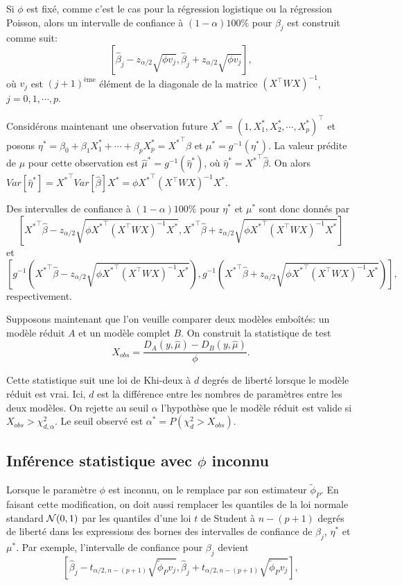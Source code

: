 \documentclass[11pt]{article}
\begin{document}
\noindent Si $\phi$ est fix\'e, comme c'est le cas pour la r\'egression logistique ou la r\'egression Poisson, alors un intervalle de confiance \`a $(1-\alpha)100\%$ pour $\beta_j$ est construit comme suit:
$$\left[\hat\beta_j -z_{\alpha/2} \sqrt{ \phi v_j},\hat\beta_j +z_{\alpha/2} \sqrt{ \phi v_j} \right],$$
o\`u $v_j$ est $(j+1)^{\mbox{\`eme}}$ \'el\'ement de la diagonale de la matrice $(X^\top W X)^{-1}$, $j=0,1,\cdots,p$.

\noindent Consid\'erons maintenant une observation future $X^*=(1,X_1^*,X_2^*,\cdots,X_p^*)^\top$ et posons $\eta^*=\beta_0+\beta_1 X_1^* + \cdots + \beta_p X_p^*= {X^*}^\top\beta$ et $\mu^*=g^{-1}(\eta^*)$. La valeur pr\'edite de $\mu$ pour cette observation est $\hat\mu^*=g^{-1}(\hat\eta^*)$, o\`u $\hat\eta^*={X^*}^\top\hat\beta$. On  alors $Var[\hat\eta^*]={X^*}^\top Var[\hat\beta]X^* =\phi {X^*}^\top (X^\top W X)^{-1} X^*$. 

\noindent Des intervalles de confiance \`a $(1-\alpha)100\%$ pour $\eta^*$ et $\mu^*$ sont donc donn\'es par
$$\left[{X^*}^\top\hat\beta -  z_{\alpha/2} \sqrt{\phi {X^*}^\top (X^\top W X)^{-1} X^*}, {X^*}^\top\hat\beta +  z_{\alpha/2} \sqrt{\phi {X^*}^\top (X^\top W X)^{-1} X^*}\right]$$
et
$$\left[g^{-1}\left({X^*}^\top\hat\beta -  z_{\alpha/2} \sqrt{\phi {X^*}^\top (X^\top W X)^{-1} X^*}\right), g^{-1}\left({X^*}^\top\hat\beta +  z_{\alpha/2} \sqrt{\phi {X^*}^\top (X^\top W X)^{-1} X^*}\right)\right],$$
\noindent respectivement.

\noindent Supposons maintenant que l'on veuille comparer deux mod\`eles embo\^it\'es: un mod\`ele r\'eduit $A$ et un mod\`ele complet $B$. On construit la statistique de test
$$X_{obs} = \frac{D_A(y,\hat\mu)-D_B(y,\hat\mu)}{\phi}.$$

\noindent Cette statistique suit une loi de Khi-deux \`a $d$ degr\'es de libert\'e lorsque le mod\`ele r\'eduit est vrai. Ici, $d$ est la diff\'erence entre les nombres de param\`etres entre les deux mod\`eles. On rejette au seuil $\alpha$ l'hypoth\`ese que le mod\`ele r\'eduit est valide si $X_{obs}>\chi^2_{d,\alpha}$. Le seuil observ\'e est $\alpha^*=P(\chi^2_d > X_{obs})$.

\subsection{Inf\'erence statistique avec $\phi$ inconnu}

\noindent Lorsque le param\`etre $\phi$ est inconnu, on le remplace par son estimateur $\tilde \phi_P$. En faisant cette modification, on doit aussi remplacer les quantiles de la loi normale standard ${\cal N}(0,1)$ par les quantiles d'une loi $t$ de Student \`a $n-(p+1)$ degr\'es de libert\'e dans les expressions des bornes des intervalles de confiance de $\beta_j$, $\eta^*$ et $\mu^*$. Par exemple, l'intervalle de confiance pour $\beta_j$ devient
$$\left[\hat\beta_j -t_{\alpha/2,n-(p+1)} \sqrt{ \tilde \phi_P v_j},\hat\beta_j +t_{\alpha/2,n-(p+1)} \sqrt{ \tilde \phi_P v_j} \right],$$
\end{document}
